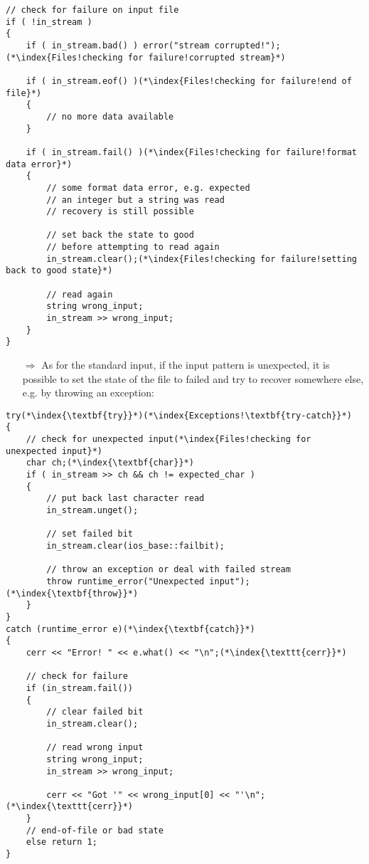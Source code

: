 \documentclass[10pt]{article}
\begin{document}
\begin{lstlisting}
// check for failure on input file
if ( !in_stream )
{
    if ( in_stream.bad() ) error("stream corrupted!");(*\index{Files!checking for failure!corrupted stream}*)
    
    if ( in_stream.eof() )(*\index{Files!checking for failure!end of file}*)
    { 
        // no more data available
    }
    
    if ( in_stream.fail() )(*\index{Files!checking for failure!format data error}*)
    {
        // some format data error, e.g. expected
        // an integer but a string was read
        // recovery is still possible
        
        // set back the state to good 
        // before attempting to read again
        in_stream.clear();(*\index{Files!checking for failure!setting back to good state}*)
        
        // read again
        string wrong_input;
        in_stream >> wrong_input;
    }
}
\end{lstlisting}
\begin{enumerate}
\item[$\Rightarrow$] As for the standard input, if the input pattern is unexpected, it is possible to set the state of the file to failed
and try to recover somewhere else, e.g. by throwing an exception:
\end{enumerate}
\begin{lstlisting}
try(*\index{\textbf{try}}*)(*\index{Exceptions!\textbf{try-catch}}*)
{
    // check for unexpected input(*\index{Files!checking for unexpected input}*)
    char ch;(*\index{\textbf{char}}*)
    if ( in_stream >> ch && ch != expected_char )
    {
        // put back last character read
        in_stream.unget();
        
        // set failed bit
        in_stream.clear(ios_base::failbit);
    
        // throw an exception or deal with failed stream
        throw runtime_error("Unexpected input");(*\index{\textbf{throw}}*)
    }
}
catch (runtime_error e)(*\index{\textbf{catch}}*)
{
    cerr << "Error! " << e.what() << "\n";(*\index{\texttt{cerr}}*)
            
    // check for failure
    if (in_stream.fail())
    {
        // clear failed bit
        in_stream.clear();
                
        // read wrong input
        string wrong_input;
        in_stream >> wrong_input;
                    
        cerr << "Got '" << wrong_input[0] << "'\n";(*\index{\texttt{cerr}}*)
    }
    // end-of-file or bad state
    else return 1;
}
\end{lstlisting}
\end{document}
